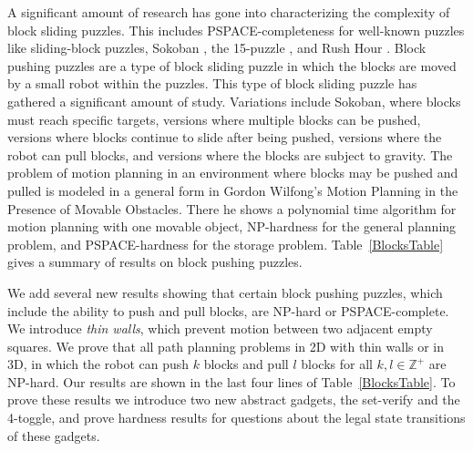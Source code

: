 A significant amount of research has gone into characterizing the complexity of block sliding puzzles. This includes PSPACE-completeness for well-known puzzles like sliding-block puzzles\cite{hearn2005pspace}, Sokoban \cite{Sokoban98, DZ96}, the 15-puzzle \cite{15Puzzle}, and Rush Hour \cite{RushHour02}. Block pushing puzzles are a type of block sliding puzzle in which the blocks are moved by a small robot within the puzzles. This type of block sliding puzzle has gathered a significant amount of study. Variations include Sokoban\cite{Sokoban98, DZ96}, where blocks must reach specific targets, versions where multiple blocks can be pushed\cite{Push100, Push*00, Push2F02}, versions where blocks continue to slide after being pushed\cite{PushPushk04, Push*00}, versions where the robot can pull blocks\cite{Pull10}, and versions where the blocks are subject to gravity\cite{Gravity}. The problem of motion planning in an environment where blocks may be pushed and pulled is modeled in a general form in Gordon Wilfong's Motion Planning in the Presence of Movable Obstacles\cite{PushPull91}. There he shows a polynomial time algorithm for motion planning with one movable object, NP-hardness for the general planning problem, and PSPACE-hardness for the storage problem. Table~\ref{BlocksTable} gives a summary of results on block pushing puzzles. 



We add several new results showing that certain block pushing puzzles, which include the ability to push and pull blocks, are NP-hard or PSPACE-complete. We introduce \emph{thin walls}, which prevent motion between two adjacent empty squares. We prove that all path planning problems in 2D with thin walls or in 3D, in which the robot can push $k$ blocks and pull $l$ blocks for all $k,l \in \mathbb{Z}^+$ are NP-hard. Our results are shown in the last four lines of Table~\ref{BlocksTable}. To prove these results we introduce two new abstract gadgets, the set-verify and the 4-toggle, and prove hardness results for questions about the legal state transitions of these gadgets. %


